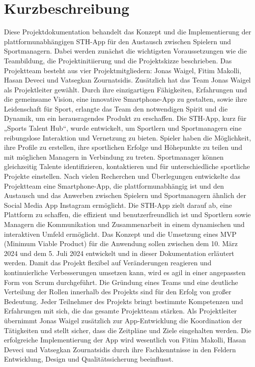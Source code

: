 \chapter{Kurzbeschreibung}
Diese Projektdokumentation behandelt das Konzept und die Implementierung der plattformunabhängigen STH-App für den Austausch zwischen Spielern und Sportmanagern.
Dabei werden zunächst die wichtigsten Voraussetzungen wie die Teambildung, die Projektinitiierung und die Projektskizze beschrieben.
Das Projektteam besteht aus vier Projektmitgliedern: Jonas Waigel, Fitim Makolli, Hasan Deveci und Vatsegkan Zournatsidis.
Zusätzlich hat das Team Jonas Waigel als Projektleiter gewählt.
Durch ihre einzigartigen Fähigkeiten, Erfahrungen und die gemeinsame Vision, eine innovative Smartphone-App zu gestalten, sowie ihre Leidenschaft für Sport, erlangte das Team den notwendigen Spirit und die Dynamik, um ein herausragendes Produkt zu erschaffen.
\newline
Die STH-App, kurz für „Sports Talent Hub“, wurde entwickelt, um Sportlern und Sportmanagern eine reibungslose Interaktion und Vernetzung zu bieten.
Spieler haben die Möglichkeit, ihre Profile zu erstellen, ihre sportlichen Erfolge und Höhepunkte zu teilen und mit möglichen Managern in Verbindung zu treten.
Sportmanager können gleichzeitig Talente identifizieren, kontaktieren und für unterschiedliche sportliche Projekte einstellen.
\newline
Nach vielen Recherchen und Überlegungen entwickelte das Projektteam eine Smartphone-App, die plattformunabhängig ist und den Austausch und das Anwerben zwischen Spielern und Sportmanagern ähnlich der Social Media App Instagram ermöglicht.
Die STH-App zielt darauf ab, eine Plattform zu schaffen, die effizient und benutzerfreundlich ist und Sportlern sowie Managern die Kommunikation und Zusammenarbeit in einem dynamischen und interaktiven Umfeld ermöglicht.
\newline
Das Konzept und die Umsetzung eines MVP (Minimum Viable Product) für die Anwendung sollen zwischen dem 10. März 2024 und dem 5. Juli 2024 entwickelt und in dieser Dokumentation erläutert werden.
Damit das Projekt flexibel auf Veränderungen reagieren und kontinuierliche Verbesserungen umsetzen kann, wird es agil in einer angepassten Form von Scrum durchgeführt.
Die Gründung eines Teams und eine deutliche Verteilung der Rollen innerhalb des Projekts sind für den Erfolg von großer Bedeutung.
Jeder Teilnehmer des Projekts bringt bestimmte Kompetenzen und Erfahrungen mit sich, die das gesamte Projektteam stärken.
Als Projektleiter übernimmt Jonas Waigel zusätzlich zur App-Entwicklung die Koordination der Tätigkeiten und stellt sicher, dass die Zeitpläne und Ziele eingehalten werden.
Die erfolgreiche Implementierung der App wird wesentlich von Fitim Makolli, Hasan Deveci und Vatsegkan Zournatsidis durch ihre Fachkenntnisse in den Feldern Entwicklung, Design und Qualitätssicherung beeinflusst.